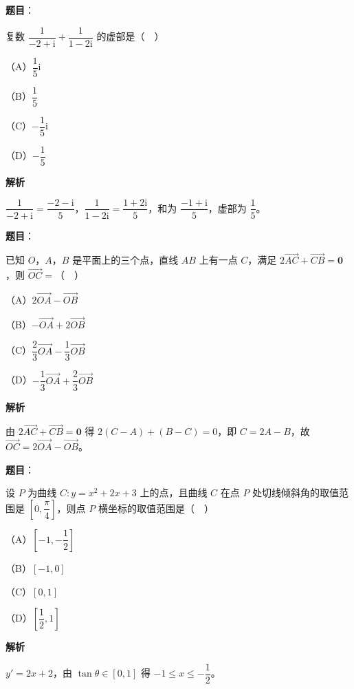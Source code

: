 \begin{answer}

\textbf{题目}：

复数 $\dfrac1{-2+\mathrm i}+\dfrac1{1-2\mathrm i}$ 的虚部是（　）

（A）$\dfrac15\mathrm i$

（B）$\dfrac15$

（C）$-\dfrac15\mathrm i$

（D）$-\dfrac15$

\textbf{解析}

$\dfrac1{-2+\mathrm i}=\dfrac{-2-\mathrm i}5$，$\dfrac1{1-2\mathrm i}=\dfrac{1+2\mathrm i}5$，和为 $\dfrac{-1+\mathrm i}5$，虚部为 $\dfrac15$。


\end{answer}
\begin{answer}

\textbf{题目}：

已知 $O$，$A$，$B$ 是平面上的三个点，直线 $AB$ 上有一点 $C$，满足 $2\overrightarrow{AC}+\overrightarrow{CB}=\boldsymbol 0$，则 $\overrightarrow{OC}=$（　）

（A）$2\overrightarrow{OA}-\overrightarrow{OB}$

（B）$-\overrightarrow{OA}+2\overrightarrow{OB}$

（C）$\dfrac23\overrightarrow{OA}-\dfrac13\overrightarrow{OB}$

（D）$-\dfrac13\overrightarrow{OA}+\dfrac23\overrightarrow{OB}$

\textbf{解析}

由 $2\overrightarrow{AC}+\overrightarrow{CB}=\boldsymbol 0$ 得 $2(C-A)+(B-C)=0$，即 $C=2A-B$，故 $\overrightarrow{OC}=2\overrightarrow{OA}-\overrightarrow{OB}$。


\end{answer}
\begin{answer}

\textbf{题目}：

设 $P$ 为曲线 $C:y=x^2+2x+3$ 上的点，且曲线 $C$ 在点 $P$ 处切线倾斜角的取值范围是 $\left[0,\dfrac{\pi}{4}\right]$，则点 $P$ 横坐标的取值范围是（　）

（A）$\left[-1,-\dfrac12\right]$

（B）$[-1,0]$

（C）$[0,1]$

（D）$\left[\dfrac12,1\right]$

\textbf{解析}

$y'=2x+2$，由 $\tan\theta\in[0,1]$ 得 $-1\leqslant x\leqslant-\dfrac12$。


\end{answer}
